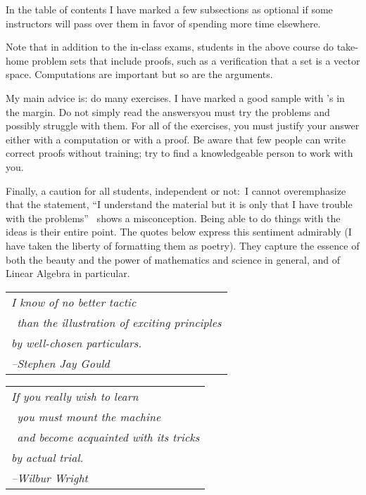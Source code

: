 {In the table of contents
I have marked a few subsections as optional if
some instructors will pass over them in favor of spending more time elsewhere. 

Note that 
in addition to the in-class exams,
students in the above course do 
take-home problem sets that include proofs, such as a verification
that a set is a vector space.
Computations are important but so are the arguments.

My main advice is: do many exercises.
I have marked a good sample with \recommendationmark's in the margin.
Do not simply read the answers\Dash you must
try the problems and possibly struggle with them.
For all of the exercises, you must justify your answer either with a computation
or with a proof.
Be aware that few people can write correct proofs without training;
try to find a knowledgeable person to work with you.

Finally, a caution for all students, independent or not:~I 
cannot overemphasize that the 
statement, ``I understand the material but it is only 
that I have trouble with the problems''\ %
shows a misconception.
Being able to do things with the ideas is their entire point.
The quotes below express this sentiment admirably
(I have taken the liberty of formatting them as poetry).
They capture the essence of both the beauty and the power
of mathematics and science in general, 
and of Linear Algebra in particular.

\medskip
\par\noindent\begin{tabular}[t]{@{}l@{}}
  \textit{I know of no better tactic}                     \\
  \textit{\ than the illustration of exciting principles} \\
  \textit{by well-chosen particulars.}                    \\
  \hspace*{1in}\textit{--Stephen Jay Gould}
\end{tabular}

\medskip
\par\noindent
\begin{tabular}[t]{@{}l@{}}   
\textit{If you really wish to learn}                     \\
   \textit{\ you must mount the machine}  \\ 
   \textit{\ and become acquainted with its tricks} \\
   \textit{by actual trial.}                    \\
   \hspace*{1in}\textit{--Wilbur Wright}
\end{tabular}

}
